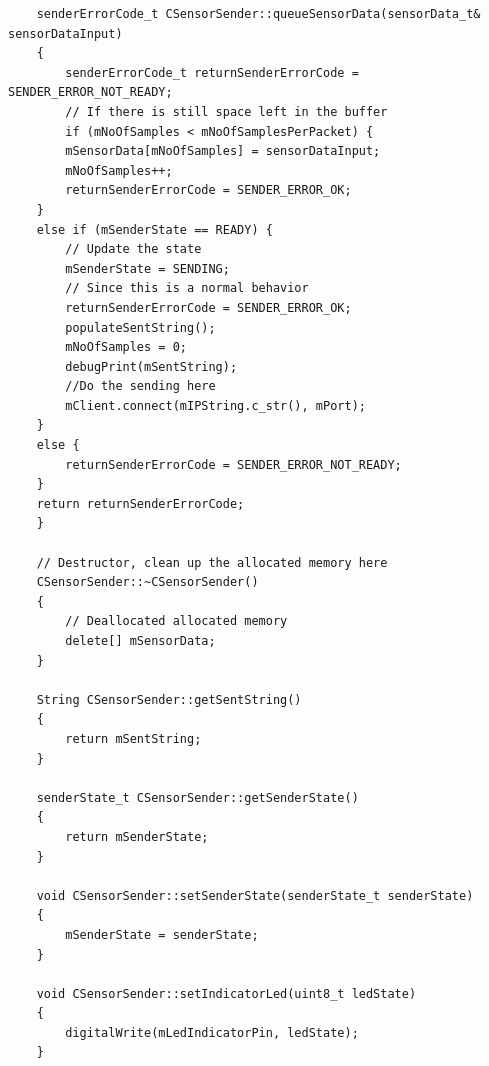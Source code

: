 \documentclass[letterpaper,12pt,titlepage,oneside,final]{book}
\begin{document}
\begin{lstlisting}
	senderErrorCode_t CSensorSender::queueSensorData(sensorData_t& sensorDataInput)
	{
		senderErrorCode_t returnSenderErrorCode = SENDER_ERROR_NOT_READY;
		// If there is still space left in the buffer
		if (mNoOfSamples < mNoOfSamplesPerPacket) {
		mSensorData[mNoOfSamples] = sensorDataInput;
		mNoOfSamples++;
		returnSenderErrorCode = SENDER_ERROR_OK;
	}
	else if (mSenderState == READY) {
		// Update the state
		mSenderState = SENDING;
		// Since this is a normal behavior
		returnSenderErrorCode = SENDER_ERROR_OK;
		populateSentString();
		mNoOfSamples = 0;
		debugPrint(mSentString);
		//Do the sending here
		mClient.connect(mIPString.c_str(), mPort);
	}
	else {
		returnSenderErrorCode = SENDER_ERROR_NOT_READY;
	}
	return returnSenderErrorCode;
	}
	
	// Destructor, clean up the allocated memory here
	CSensorSender::~CSensorSender()
	{
		// Deallocated allocated memory
		delete[] mSensorData;
	}
	
	String CSensorSender::getSentString()
	{
		return mSentString;
	}
	
	senderState_t CSensorSender::getSenderState()
	{
		return mSenderState;
	}
	
	void CSensorSender::setSenderState(senderState_t senderState)
	{
		mSenderState = senderState;
	}
	
	void CSensorSender::setIndicatorLed(uint8_t ledState)
	{
		digitalWrite(mLedIndicatorPin, ledState);
	}
\end{lstlisting}
\end{document}
